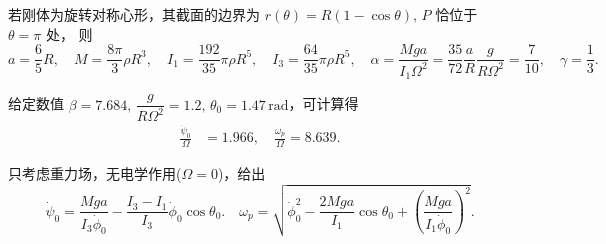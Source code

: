 \begin{example}
	若刚体为旋转对称心形，其截面的边界为 \(r (\theta) = R (1 - \cos \theta)\), \(P\) 恰位于 \(\theta = \pi\) 处，
	则
	\begin{equation*}
		a = \frac{6}{5} R, \quad M = \frac{8 \pi}{3} \rho R^3, \quad I_1 = \frac{192}{35} \pi \rho R^5, \quad I_3 = \frac{64}{35} \pi \rho R^5,\quad
		\alpha = \frac{M g a}{I_1\Omega^2}
		= \frac{35}{72}\frac{a}{R}\frac{g}{R\Omega^2}
		= \frac{7}{10}, \quad \gamma = \frac{1}{3}.
	\end{equation*}

	给定数值 \(\beta = 7.684,\, \dfrac{g}{R\Omega^2}=1.2,\, \theta_0=1.47\,\mathrm{rad}\)，可计算得
	\begin{align*}
		\frac{\dot{\psi}_0}{\Omega} & = 1.966, \quad \frac{\omega_p}{\Omega} = 8.639.
	\end{align*}
\end{example}

\begin{example}
	只考虑重力场，无电学作用(\(\Omega=0\))，给出
	\begin{equation*}
		\dot{\psi}_0 = \frac{M g a}{I_3 \dot{\phi}_0} - \frac{I_3-I_1}{I_3}\dot{\phi}_0\cos \theta_0.\quad
		\omega_p=\sqrt{\dot{\phi}_0^2-\frac{2Mga}{I_1}\cos\theta_0+\left(\frac{Mga}{I_1\dot{\phi}_0}\right)^2}.
	\end{equation*}
\end{example}

